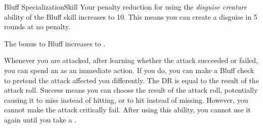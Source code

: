 \begin{feat}{Bluff Specialization}{Skill}
         Your penalty reduction for using the \textit{disguise creature} ability of the Bluff skill increases to 10.
        This means you can create a disguise in 5 rounds at no penalty.

         The bonus to Bluff increases to .

         Whenever you are attacked, after learning whether the attack succeeded or failed, you can spend an  as an immediate action.
        If you do, you can make a Bluff check to pretend the attack affected you differently.
        The DR is equal to the result of the attack roll.
        Success means you can choose the result of the attack roll, potentially causing it to miss instead of hitting, or to hit instead of missing.
        However, you cannot make the attack critically fail.
        After using this ability, you cannot use it again until you take a .
    \end{feat}

